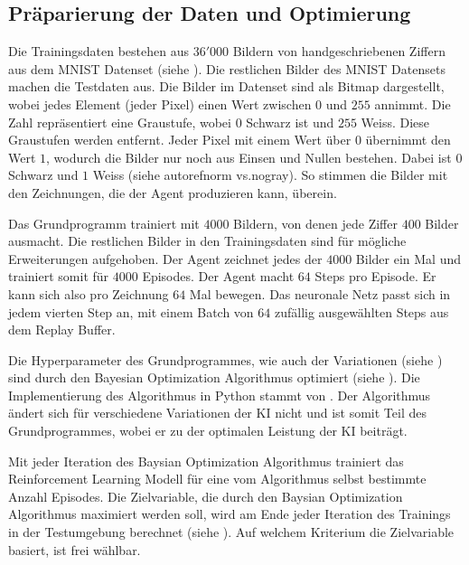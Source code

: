 \subsection{Präparierung der Daten und Optimierung}\label{sub:m_grund_data}
Die Trainingsdaten bestehen aus $36'000$ Bildern von handgeschriebenen Ziffern
aus dem MNIST Datenset (siehe ). Die restlichen Bilder des
MNIST Datensets machen die Testdaten aus. Die Bilder im Datenset sind als Bitmap
dargestellt, wobei jedes Element (jeder Pixel) einen Wert zwischen $0$ und $255$
annimmt. Die Zahl repräsentiert eine Graustufe, wobei $0$ Schwarz ist und $255$
Weiss. Diese Graustufen werden entfernt. Jeder Pixel mit einem Wert über $0$
übernimmt den Wert $1$, wodurch die Bilder nur noch aus Einsen und Nullen
bestehen. Dabei ist $0$ Schwarz und $1$ Weiss (siehe autoref{norm vs.nogray}).
So stimmen die Bilder mit den Zeichnungen, die der Agent produzieren kann,
überein.


Das Grundprogramm trainiert mit $4000$ Bildern, von denen jede Ziffer $400$
Bilder ausmacht. Die restlichen Bilder in den Trainingsdaten sind für mögliche  
Erweiterungen aufgehoben. Der Agent zeichnet jedes der $4000$ Bilder ein Mal und
trainiert somit für $4000$ Episodes. Der Agent macht $64$ Steps pro Episode. Er
kann sich also pro Zeichnung $64$ Mal bewegen. Das neuronale Netz passt sich in
jedem vierten Step an, mit einem Batch von $64$ zufällig ausgewählten Steps aus
dem Replay Buffer.

Die Hyperparameter des Grundprogrammes, wie auch der Variationen (siehe
) sind durch den Bayesian Optimization Algorithmus optimiert
(siehe ). Die Implementierung des Algorithmus in Python
stammt von \cite{fernando_nogueira_bayesian_2014}. Der Algorithmus ändert sich
für verschiedene Variationen der KI nicht und ist somit Teil des
Grundprogrammes, wobei er zu der optimalen Leistung der KI beiträgt. 

Mit jeder Iteration des Baysian Optimization Algorithmus trainiert das
Reinforcement Learning Modell für eine vom Algorithmus selbst bestimmte Anzahl
Episodes. Die Zielvariable, die durch den Baysian Optimization Algorithmus
maximiert werden soll, wird am Ende jeder Iteration des Trainings in der
Testumgebung berechnet (siehe ). Auf welchem
Kriterium die Zielvariable basiert, ist frei wählbar.



